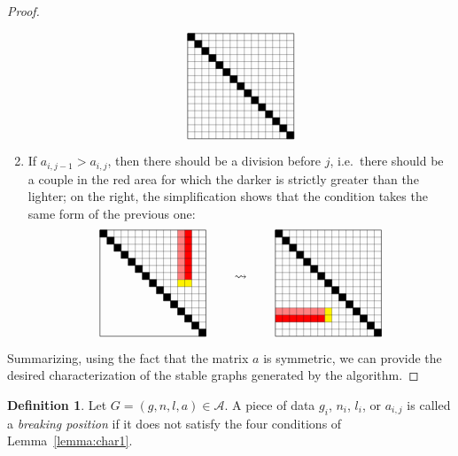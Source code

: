 \documentclass{amsart}
\theoremstyle{plain}
\theoremstyle{definition}
\newtheorem{definition}[theorem]{Definition}
\begin{document}
\begin{proof}
\begin{enumerate}
\[\begin{tikzpicture}[xscale=0.2,yscale=-0.2,baseline=-40]
      \draw (0,0) -- (15,0) -- (15,15) -- (0,15) -- cycle;
      \foreach \x in {1,2,...,14}
      {
        \draw [very thin] (0,\x) -- (15,\x);
        \draw [very thin] (\x,0) -- (\x,15);
      }
      \foreach \x in {0,1,...,14}
        \filldraw  (\x,\x) -- (\x,\x+1) -- (\x+1,\x+1) -- (\x+1,\x) -- cycle;
    \end{tikzpicture}
    \]
  \item If $a_{i, j-1} > a_{i, j}$, then there should be a division
    before $j$, i.e.\ there should be a couple in the red area for
    which the darker is strictly greater than the lighter; on the
    right, the simplification shows that the condition takes the same
    form of the previous one:
    \[
    \begin{tikzpicture}[xscale=0.2,yscale=-0.2,baseline=-40]
      \fill [yellow] (13,7) -- (13,8) -- (11,8) -- (11,7) -- cycle;
      \fill [red!50] (11,0) -- (11,7) -- (12,7) -- (12,0) -- cycle;
      \fill [red!100] (12,0) -- (12,7) -- (13,7) -- (13,0) -- cycle;

      \draw (0,0) -- (15,0) -- (15,15) -- (0,15) -- cycle;
      \foreach \x in {1,2,...,14}
      {
        \draw [very thin] (\x,\x) -- (15,\x);
        \draw [very thin] (\x,0) -- (\x,\x);
      }
      \foreach \x in {0,1,...,14}
        \filldraw (\x,\x) -- (\x,\x+1) -- (\x+1,\x+1) -- (\x+1,\x) -- cycle;
    \end{tikzpicture}
    \qquad \leadsto \qquad
    \begin{tikzpicture}[xscale=0.2,yscale=-0.2,baseline=-40]
      \fill [yellow] (7,13) -- (8,13) -- (8,11) -- (7,11) -- cycle;
      \fill [red!50] (0,11) -- (7,11) -- (7,12) -- (0,12) -- cycle;
      \fill [red!100] (0,12) -- (7,12) -- (7,13) -- (0,13) -- cycle;

      \draw (0,0) -- (15,0) -- (15,15) -- (0,15) -- cycle;
      \foreach \x in {1,2,...,14}
      {
        \draw [very thin] (0,\x) -- (15,\x);
        \draw [very thin] (\x,0) -- (\x,15);
      }
      \foreach \x in {0,1,...,14}
        \filldraw (\x,\x) -- (\x,\x+1) -- (\x+1,\x+1) -- (\x+1,\x) -- cycle;
    \end{tikzpicture}
    \]
  \end{enumerate}

  Summarizing, using the fact that the matrix $a$ is symmetric, we can
  provide the desired characterization of the stable graphs generated
  by the algorithm.
\end{proof}

\begin{definition}
  Let $G = (g, n, l, a) \in \mathcal{A}$. A piece of data $g_i$,
  $n_i$, $l_i$, or $a_{i,j}$ is called a \emph{breaking position\/} if
  it does not satisfy the four conditions of
  Lemma~\ref{lemma:char1}.
\end{definition}
\end{document}
